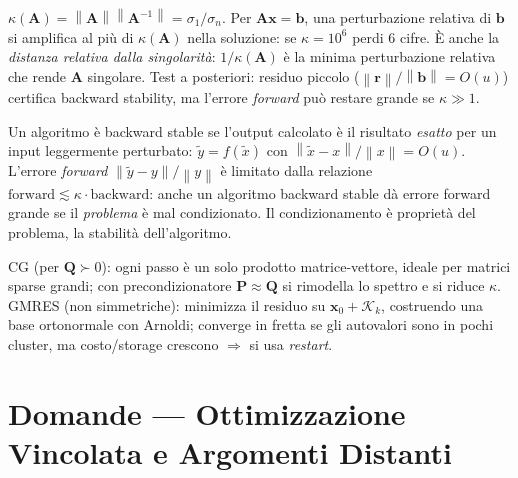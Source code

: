 \documentclass[11pt, a4paper, twoside]{book}
\theoremstyle{definition}
\theoremstyle{plain}
\theoremstyle{remark}
\newcommand{\rimando}[1]{\smallskip\noindent{\small\textit{Rif.:} #1}}
\newcommand{\norm}[1]{\left\lVert #1 \right\rVert}
\begin{document}
\begin{qbox}
$\kappa(\mathbf{A})=\norm{\mathbf{A}}\norm{\mathbf{A}^{-1}}=\sigma_1/\sigma_n$. Per $\mathbf{Ax}=\mathbf{b}$, una
perturbazione relativa di $\mathbf{b}$ si amplifica al pi\`u di $\kappa(\mathbf{A})$ nella soluzione: se
$\kappa=10^6$ perdi 6 cifre. \`E anche la \emph{distanza relativa dalla singolarit\`a}: $1/\kappa(\mathbf{A})$ \`e la
minima perturbazione relativa che rende $\mathbf{A}$ singolare. Test a posteriori: residuo piccolo
($\norm{\mathbf{r}}/\norm{\mathbf{b}}=O(u)$) certifica backward stability, ma l'errore \emph{forward} pu\`o restare
grande se $\kappa\gg1$.
\rimando{Cap.~\ref{sec:condizionamento}, \ref{sec:stabilita}.}
\end{qbox}

\begin{qbox}
Un algoritmo \`e backward stable se l'output calcolato \`e il risultato \emph{esatto} per un input leggermente
perturbato: $\tilde y=f(\tilde x)$ con $\norm{\tilde x-x}/\norm{x}=O(u)$. L'errore \emph{forward}
$\norm{\tilde y-y}/\norm{y}$ \`e limitato dalla relazione
$\text{forward}\lesssim\kappa\cdot\text{backward}$: anche un algoritmo backward stable d\`a errore forward grande se il
\emph{problema} \`e mal condizionato. Il condizionamento \`e propriet\`a del problema, la stabilit\`a
dell'algoritmo.
\rimando{Cap.~\ref{sec:stabilita}.}
\end{qbox}

\begin{qbox}
CG (per $\mathbf{Q}\succ0$): ogni passo \`e un solo prodotto matrice-vettore, ideale per matrici sparse grandi; con
precondizionatore $\mathbf{P}\approx\mathbf{Q}$ si rimodella lo spettro e si riduce $\kappa$. GMRES (non simmetriche):
minimizza il residuo su $\mathbf{x}_0+\mathcal{K}_k$, costruendo una base ortonormale con Arnoldi; converge in fretta
se gli autovalori sono in pochi cluster, ma costo/storage crescono $\Rightarrow$ si usa \emph{restart}.
\rimando{Cap.~\ref{sec:cg-sistemi}, \ref{sec:gmres}.}
\end{qbox}

\chapter{Domande --- Ottimizzazione Vincolata e Argomenti Distanti}
\end{document}
